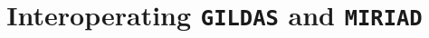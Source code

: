 \documentclass[11pt,twoside]{article}  %
\newcommand{\GILDAS}{\texttt{GILDAS}}
\newcommand{\MIRIAD}{\texttt{MIRIAD}}
\begin{document}

%
%
%


%
% 
%
%

\title{Interoperating \GILDAS{} and \MIRIAD{}}


%
%
%
\end{document}
